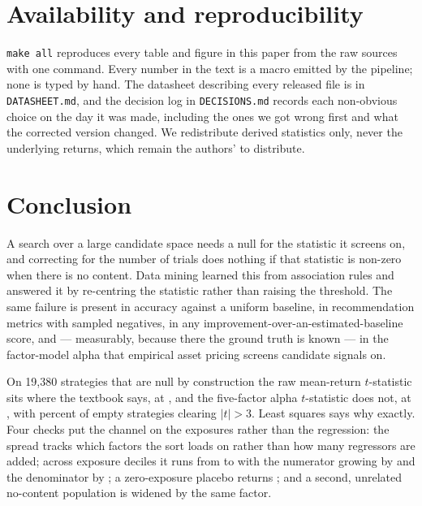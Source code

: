 \documentclass{article}
\begin{document}
\section{Availability and reproducibility}

\texttt{make all} reproduces every table and figure in this paper from the raw
sources with one command. Every number in the text is a macro emitted by the
pipeline; none is typed by hand. The datasheet describing every released file
is in \texttt{DATASHEET.md}, and the decision log in \texttt{DECISIONS.md}
records each non-obvious choice on the day it was made, including the ones we
got wrong first and what the corrected version changed. We redistribute derived
statistics only, never the underlying returns, which remain the authors' to
distribute.

\section{Conclusion}

A search over a large candidate space needs a null for the statistic it screens
on, and correcting for the number of trials does nothing if that statistic is
non-zero when there is no content. Data mining learned this from association
rules and answered it by re-centring the statistic rather than raising the
threshold. The same failure is present in accuracy against a uniform baseline,
in recommendation metrics with sampled negatives, in any
improvement-over-an-estimated-baseline score, and --- measurably, because there
the ground truth is known --- in the factor-model alpha that empirical asset
pricing screens candidate signals on.

On 19{,}380 strategies that are null by construction the raw mean-return
$t$-statistic sits where the textbook says, at \bzoonullMeanSdVw{}, and the
five-factor alpha $t$-statistic does not, at \bzoonullFfSdVw{}, with
\bzooamThreeFfFiveVwPct{} percent of empty strategies clearing $|t| > 3$. Least
squares says why exactly. Four checks put the channel on the exposures rather
than the regression: the spread tracks which factors the sort loads on rather
than how many regressors are added; across exposure deciles it runs from
\bzooamDecileOneSd{} to \bzooamDecileTenSd{} with the numerator growing by
\bzooamDecileNumeratorRatio{} and the denominator by
\bzooamDecileDenominatorRatio{}; a zero-exposure placebo returns
\bzooamPlaceboIid{}; and a second, unrelated no-content population is widened
by the same factor.
\end{document}
